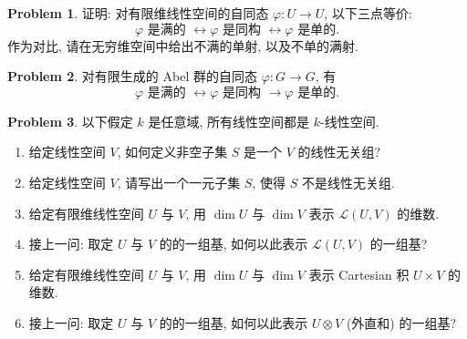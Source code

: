 \documentclass{MainStyle}
\theoremstyle{definition}
\newtheorem{problem}{Problem}
\begin{document}
\begin{problem}
证明: 对有限维线性空间的自同态 $\varphi:U\to U$, 以下三点等价:
\begin{equation}
    \varphi\text{ 是满的 }\leftrightarrow\varphi\text{ 是同构 }\leftrightarrow\varphi\text{ 是单的}.
\end{equation}
作为对比, 请在无穷维空间中给出不满的单射, 以及不单的满射.
\end{problem}

\begin{problem}
对有限生成的 Abel 群的自同态 $\varphi:G\to G$, 有
\begin{equation}
    \varphi\text{ 是满的 }\leftrightarrow\varphi\text{ 是同构 }\rightarrow \varphi\text{ 是单的}.
\end{equation}
\end{problem}

\begin{problem}
以下假定 $k$ 是任意域, 所有线性空间都是 $k$-线性空间.
\begin{enumerate}
    \item 给定线性空间 $V$, 如何定义非空子集 $S$ 是一个 $V$ 的线性无关组?
    \item 给定线性空间 $V$, 请写出一个一元子集 $S$, 使得 $S$ 不是线性无关组.
    \item 给定有限维线性空间 $U$ 与 $V$, 用 $\dim U$ 与 $\dim V$ 表示 $\mathcal L(U,V)$ 的维数.
    \item 接上一问: 取定 $U$ 与 $V$ 的的一组基, 如何以此表示 $\mathcal L(U,V)$ 的一组基?
    \item 给定有限维线性空间 $U$ 与 $V$, 用 $\dim U$ 与 $\dim V$ 表示 Cartesian 积 $U\times V$ 的维数.
    \item 接上一问: 取定 $U$ 与 $V$ 的的一组基, 如何以此表示 $U\otimes V$ (外直和) 的一组基?
\end{enumerate}
\end{problem}
\end{document}
